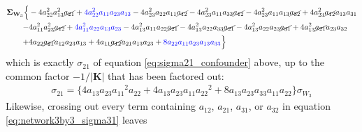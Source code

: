 \documentclass{article}
\begin{document}
\begin{equation}
\begin{aligned}
\mathbf{\Sigma}_{\textbf{W}_{3}} \Bigl\{& -4a_{22}^{2} a_{13}^{2} \cancel{a_{21}} + \textcolor{blue}{4 a_{22}^{2} a_{11} a_{23} a_{13}} - 4 a_{23}^{2} a_{22} a_{11} \cancel{a_{12}} - 4 a_{23}^{2} a_{11} a_{33} \cancel{a_{12}} - 4 a_{23}^{2} a_{11} a_{13} \cancel{a_{32}} + 4 a_{23}^{2} \cancel{a_{12}} a_{13} a_{31} \\
-& 4 a_{11}^{2} a_{23}^{2} \cancel{a_{12}} + \textcolor{blue}{4 a_{11}^{2} a_{22} a_{13} a_{23}} - 4 a_{13}^{2} a_{11} a_{22} \cancel{a_{21}} - 4 a_{13}^{2} a_{22} a_{33} \cancel{a_{21}} - 4 a_{13}^{2} a_{22} a_{23} \cancel{a_{31}} + 4 a_{13}^{2} \cancel{a_{21}} a_{23} a_{32} \\
+& 4 a_{22} \cancel{a_{21}} a_{12} a_{23} a_{13} + 4 a_{11} \cancel{a_{12}} a_{21} a_{13} a_{23} + \textcolor{blue}{8 a_{22} a_{11} a_{23} a_{13} a_{33}}\Bigr\}
\end{aligned}
\end{equation}
which is exactly $\sigma_{21}$ of equation \ref{eq:sigma21_confounder} above, up to the common factor $-1/|\mathbf{K}|$ that has been factored out:
\begin{align*}
\sigma_{21}= \{ 4a_{13}a_{23}{a_{11}}^2a_{22}+4a_{13}a_{23}a_{11}{a_{22}}^2+8a_{13}a_{23}a_{33}a_{11}a_{22} \} \sigma_{W_{3}}
\end{align*}
Likewise, crossing out every term containing $a_{12}$, $a_{21}$, $a_{31}$, or $a_{32}$ in equation \ref{eq:network3by3_sigma31} leaves
\end{document}
